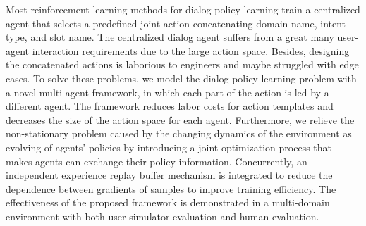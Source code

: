 Most reinforcement learning methods for dialog policy learning train a centralized agent that selects a predefined joint action concatenating domain name, intent type, and slot name. The centralized dialog agent suffers from a great many user-agent interaction requirements due to the large action space. Besides, designing the concatenated actions is laborious to engineers and maybe struggled with edge cases. To solve these problems,  we model the dialog policy learning problem with a novel multi-agent framework, in which each part of the action is led by a different agent. The framework reduces labor costs for action templates and decreases the size of the action space for each agent. Furthermore, we relieve the non-stationary problem caused by the changing dynamics of the environment as evolving of agents' policies by introducing a joint optimization process that makes agents can exchange their policy information. Concurrently, an independent experience replay buffer mechanism is integrated to reduce the dependence between gradients of samples to improve training efficiency. The effectiveness of the proposed framework is demonstrated in a multi-domain environment with both user simulator evaluation and human evaluation.
